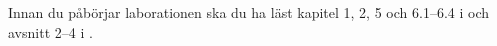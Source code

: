 Innan du påbörjar laborationen ska du ha läst kapitel 1, 2, 5 och 6.1--6.4 
i \cite{Brookshear2012csa} och avsnitt 2--4 i  
\cite{pythonkramaren1}.
